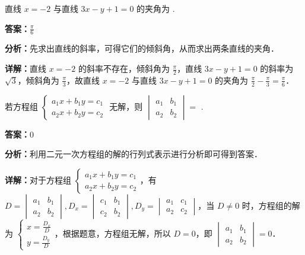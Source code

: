 \begin{question}[points=4]
直线 $x=-2$ 与直线 $3x-y+1=0$ 的夹角为  .
\fillin[{$\frac{\pi}{6}$}]
\begin{solution}
\textbf{答案：}$\frac{\pi}{6}$

\textbf{分析：}先求出直线的斜率，可得它们的倾斜角，从而求出两条直线的夹角．

\textbf{详解：}直线 $x=-2$ 的斜率不存在，倾斜角为 $\frac{\pi}{2}$，直线 $3x-y+1=0$ 的斜率为 $\sqrt{3}$，倾斜角为 $\frac{\pi}{3}$，故直线 $x=-2$ 与直线 $3x-y+1=0$ 的夹角为 $\frac{\pi}{2}-\frac{\pi}{3}=\frac{\pi}{6}$．
\end{solution}
\end{question}

\begin{question}[points=4]
若方程组 $\begin{cases} a_1x+b_1y=c_1 \\ a_2x+b_2y=c_2 \end{cases}$ 无解，则 $\begin{vmatrix} a_1 & b_1 \\ a_2 & b_2 \end{vmatrix}=$  .
\fillin[{$0$}]
\begin{solution}
\textbf{答案：}$0$

\textbf{分析：}利用二元一次方程组的解的行列式表示进行分析即可得到答案．

\textbf{详解：}对于方程组 $\begin{cases} a_1x+b_1y=c_1 \\ a_2x+b_2y=c_2 \end{cases}$，有 $D=\begin{vmatrix} a_1 & b_1 \\ a_2 & b_2 \end{vmatrix}, D_x=\begin{vmatrix} c_1 & b_1 \\ c_2 & b_2 \end{vmatrix}, D_y=\begin{vmatrix} a_1 & c_1 \\ a_2 & c_2 \end{vmatrix}$，当 $D\neq 0$ 时，方程组的解为 $\begin{cases} x=\frac{D_x}{D} \\ y=\frac{D_y}{D} \end{cases}$，根据题意，方程组无解，所以 $D=0$，即 $\begin{vmatrix} a_1 & b_1 \\ a_2 & b_2 \end{vmatrix}=0$．
\end{solution}
\end{question}

